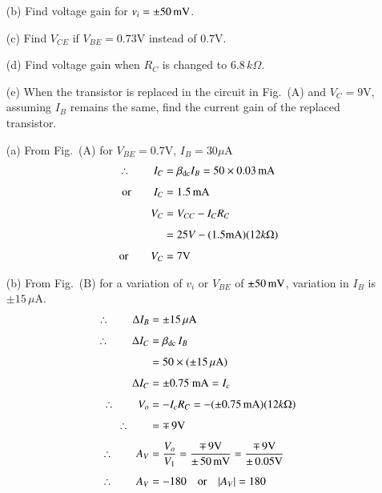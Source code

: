 \begin{example}
\begin{itemize}
\item[(b)] Find voltage gain for $v_{i}=\pm 50\text{\,mV}$.

\item[(c)] Find $V_{CE}$ if $V_{BE}=0.73\text{V}$ instead of $0.7\text{V}$.

\item[(d)] Find voltage gain when $R_{C}$ is changed to $6.8\, k\Omega$.

\item[(e)] When the transistor is replaced in the circuit in Fig.~(A) and $V_{C}=9\text{V}$, assuming $I_{B}$ remains the same, find the current gain of the replaced transistor.
\end{itemize}
\end{example}

\begin{solution}
\begin{itemize}
\item[(a)] From Fig.~(A) for $V_{BE}=0.7\text{V}$, $I_{B}=30\mu \text{A}$
\begin{align*}
\therefore\qquad I_{C}&=\beta_{\operatorname{dc}}I_{B}=50\times 0.03\text{\,mA}\\[4pt]
\text{or}\qquad I_{C} &= 1.5\text{\,mA}\\[4pt]
V_{C} &= V_{CC}-I_{C}R_{C}\\[4pt]
&= 25V-(1.5\text{mA})(12k\Omega)\\[4pt]
\text{or}\qquad V_{C} &= 7\text{V}
\end{align*}

\item[(b)] From Fig.~(B) for a variation of $v_{i}$ or $V_{BE}$ of $\pm 50\text{\,mV}$, variation in $I_{B}$ is $\pm 15\,\mu\text{A}$.
\begin{align*}
\therefore\qquad \Delta I_{B} &= \pm 15\,\mu\text{A}\\[4pt]
\therefore\qquad \Delta I_{C} &= \beta_{\operatorname{dc}}\,I_{B}\\[4pt]
&= 50\times (\pm 15\,\mu\text{A})\\[4pt]
\Delta I_{C} &= \pm 0.75\text{~mA}=I_{c}\\[4pt]
\therefore\qquad V_{o} &= -I_{c}R_{C}=-(\pm 0.75\text{\,mA})(12 k\Omega)\\[4pt]
\therefore\qquad &= \mp\, 9\text{V}\\[4pt]
\therefore\qquad A_{V} &= \frac{V_{o}}{V_{1}}=\dfrac{\mp\,9\text{V}}{\pm\,50\text{\,mV}}=\frac{\mp\,9\text{V}}{\pm\,0.05\text{V}}\\[4pt]
\therefore\qquad A_{V} &= -180\quad\text{or}\quad |A_{V}|=180
\end{align*}


\end{itemize}
\end{solution}

